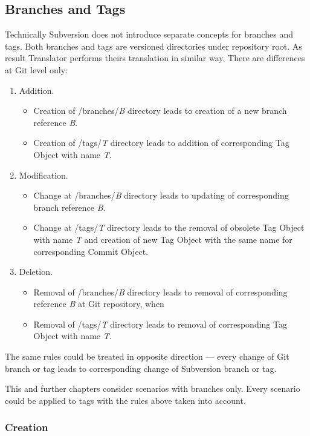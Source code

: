 \subsection{Branches and Tags}

Technically Subversion does not introduce separate concepts for branches and tags. Both branches and tags are versioned directories under repository root. As result Translator performs theirs translation in similar way. There are differences at Git level only:
\begin{enumerate}
	\compactlist
	\item Addition.
	\begin{itemize}
		\item Creation of /branches/\emph{B} directory leads to creation of a new branch reference \emph{B}.
		\item Creation of /tags/\emph{T} directory leads to addition of corresponding Tag Object with name \emph{T}.
	\end{itemize}
	\item Modification.
	\begin{itemize}
		\item Change at /branches/\emph{B} directory leads to updating of corresponding branch reference \emph{B}.
		\item Change at /tags/\emph{T} directory leads to the removal of obsolete Tag Object with name \emph{T} and creation of new Tag Object with the same name for corresponding Commit Object.
	\end{itemize}
	\item Deletion.
	\begin{itemize}
		\item Removal of /branches/\emph{B} directory leads to removal of corresponding reference \emph{B} at Git repository, when
		\item Removal of /tags/\emph{T} directory leads to removal of corresponding Tag Object with name \emph{T}.
	\end{itemize}
\end{enumerate}

The same rules could be treated in opposite direction --- every change of Git branch or tag leads to corresponding change of Subversion branch or tag.

This and further chapters consider scenarios with branches only. Every scenario could be applied to tags with the rules above taken into account.

\subsubsection{Creation}

